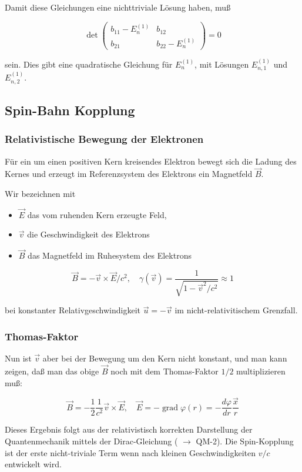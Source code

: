 \documentclass[10pt, letterpaper]{article}
\begin{document}
Damit diese Gleichungen eine nichttriviale Lösung haben, muß

$$
\operatorname{det}\left(\begin{array}{cc}
b_{11}-E_{n}^{(1)} & b_{12} \\
b_{21} & b_{22}-E_{n}^{(1)}
\end{array}\right)=0
$$

sein. Dies gibt eine quadratische Gleichung für $E_{n}^{(1)}$, mit Lösungen $E_{n, 1}^{(1)}$ und $E_{n, 2}^{(1)}$.

\subsection*{Spin-Bahn Kopplung}
\subsubsection*{Relativistische Bewegung der Elektronen}
Für ein um einen positiven Kern kreisendes Elektron bewegt sich die Ladung des Kernes und erzeugt im Referenzsystem des Elektrons ein Magnetfeld $\vec{B}$.

Wir bezeichnen mit

\begin{itemize}
  \item $\vec{E}$ das vom ruhenden Kern erzeugte Feld,
  \item $\vec{v}$ die Geschwindigkeit des Elektrons
  \item $\vec{B}$ das Magnetfeld im Ruhesystem des Elektrons
\end{itemize}

$$
\vec{B}=-\vec{v} \times \vec{E} / c^{2}, \quad \gamma(\vec{v})=\frac{1}{\sqrt{1-\vec{v}^{2} / c^{2}}} \approx 1
$$

bei konstanter Relativgeschwindigkeit $\vec{u}=-\vec{v}$ im nicht-relativitischem Grenzfall.

\subsubsection*{Thomas-Faktor}
Nun ist $\vec{v}$ aber bei der Bewegung um den Kern nicht konstant, und man kann zeigen, daß man das obige $\vec{B}$ noch mit dem Thomas-Faktor $1 / 2$ multiplizieren muß:

$$
\vec{B}=-\frac{1}{2} \frac{1}{c^{2}} \vec{v} \times \vec{E}, \quad \vec{E}=-\operatorname{grad} \varphi(r)=-\frac{d \varphi}{d r} \frac{\vec{x}}{r}
$$

Dieses Ergebnis folgt aus der relativistisch korrekten Darstellung der Quantenmechanik mittels der Dirac-Gleichung ( $\rightarrow$ QM-2). Die Spin-Kopplung ist der erste nicht-triviale Term wenn nach kleinen Geschwindigkeiten $v / c$ entwickelt wird.
\end{document}
